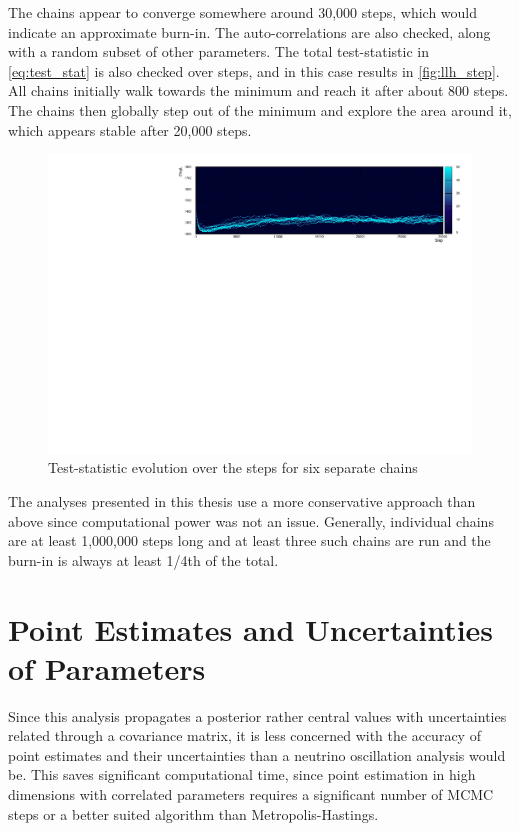 The chains appear to converge somewhere around 30,000 steps, which would indicate an approximate burn-in. The auto-correlations are also checked, along with a random subset of other parameters. The total test-statistic in \autoref{eq:test_stat} is also checked over steps, and in this case results in \autoref{fig:llh_step}. All chains initially walk towards the minimum and reach it after about 800 steps. The chains then globally step out of the minimum and explore the area around it, which appears stable after 20,000 steps.
\begin{figure}[h]
	\includegraphics[width=\textwidth, trim={0mm 0mm 0mm 0mm}, clip,page=1]{figures/mcmc/logl_step0}
	\caption{Test-statistic evolution over the steps for six separate chains}
	\label{fig:llh_step}
\end{figure}

The analyses presented in this thesis use a more conservative approach than above since computational power was not an issue. Generally, individual chains are at least 1,000,000 steps long and at least three such chains are run and the burn-in is always at least 1/4th of the total.

\section{Point Estimates and Uncertainties of Parameters}
Since this analysis propagates a posterior rather central values with uncertainties related through a covariance matrix, it is less concerned with the accuracy of point estimates and their uncertainties than a neutrino oscillation analysis would be. This saves significant computational time, since point estimation in high dimensions with correlated parameters requires a significant number of MCMC steps or a better suited algorithm than Metropolis-Hastings.

